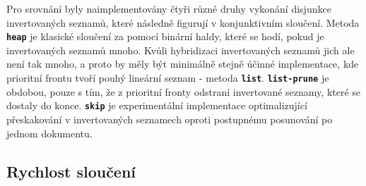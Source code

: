 \documentclass[11pt,letterpaper,oneside,openright]{book}
\newcommand{\bftt}[1]{\texttt{\textbf{#1}}}
\begin{document}
Pro srovnání byly naimplementovány čtyři různé druhy vykonání disjunkce
invertovaných seznamů, které následně figurují v konjunktivním sloučení.
Metoda \bftt{heap} je klasické sloučení za pomocí binární haldy, které se hodí,
pokud je invertovaných seznamů mnoho. Kvůli hybridizaci invertovaných seznamů
jich ale není tak mnoho, a proto by měly být minimálně stejně účinné
implementace, kde prioritní frontu tvoří pouhý lineární seznam - metoda
\bftt{list}. \bftt{list-prune} je obdobou, pouze s tím, že z prioritní fronty
odstraní invertované seznamy, které se dostaly do konce. \bftt{skip} je
experimentální implementace optimalizující přeskakování v invertovaných
seznamech oproti postupnému posunování po jednom dokumentu.


\newpage
\subsection{Rychlost sloučení}
\end{document}
